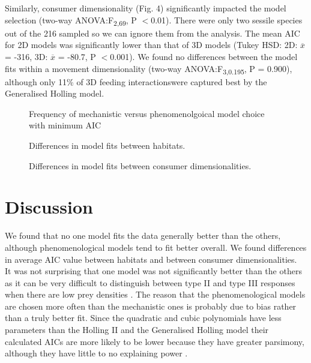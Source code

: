 \documentclass[11pt]{article}
\begin{document}
	Similarly, consumer dimensionality (Fig. 4) significantly impacted the model selection (two-way ANOVA:F\textsubscript{2,69}, P $<$0.01). There were only two sessile species out of the 216 sampled so we can ignore them from the analysis. The mean AIC for 2D models was significantly lower than that of 3D models (Tukey HSD: 2D: $\overline{x}$ = -316, 3D: $\overline{x}$ = -80.7, P $<$0.001). We found no differences between the model fits within a movement dimensionality (two-way ANOVA:F\textsubscript{3,0.195}, P = 0.900), although only 11\% of 3D feeding interactionswere captured best by the Generalised Holling model. 
	
	\newpage
	
	\begin{figure}[h!]
		
		
		\caption{Frequency of mechanistic versus phenomenolgoical model choice with minimum AIC}	
		
	\end{figure} 

	\newpage

	\begin{figure}[h!]
	
	
	\caption{Differences in model fits between habitats.}
	
	\end{figure} 

	\newpage
	
	\begin{figure}[h!]
	
	
	\caption{Differences in model fits between consumer dimensionalities.}

	\end{figure} 

	\newpage
	
	\section*{Discussion}
	
	
	We found that no one model fits the data generally better than the others, although phenomenological models tend to fit better overall. We found differences in average AIC value between habitats and between consumer dimensionalities. \\

	It was not surprising that one model was not significantly better than the others as it can be very difficult to distinguish between type II and type III responses when there are low prey densities \cite{Dunn2020}. The reason that the phenomenological models are chosen more often than the mechanistic ones is probably due to bias rather than a truly better fit. Since the quadratic and cubic polynomials have less parameters than the Holling II and the Generalised Holling model their calculated AICs are more likely to be lower because they have greater parsimony, although they have little to no explaining power \cite{Posada2004a}. \\
\end{document}
